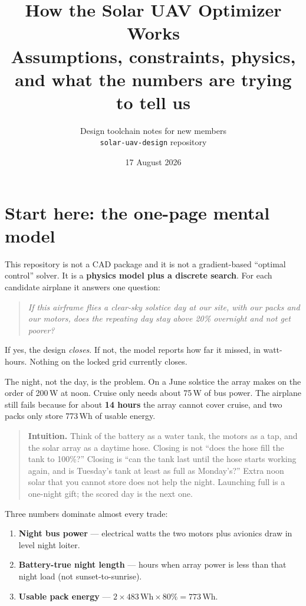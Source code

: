 \documentclass[11pt,letterpaper]{article}
\title{\textbf{How the Solar UAV Optimizer Works}\\[0.4em]
\large Assumptions, constraints, physics, and what the numbers are trying to tell us}
\author{Design toolchain notes for new members\\
\texttt{solar-uav-design} repository}
\date{17 August 2026}
\newenvironment{intuition}{\begin{quote}\small}{\end{quote}}
\begin{document}
\maketitle
\tableofcontents
\newpage

\section{Start here: the one-page mental model}

This repository is not a CAD package and it is not a gradient-based ``optimal control'' solver.
It is a \textbf{physics model plus a discrete search}. For each candidate airplane it answers one question:

\begin{quote}
\textit{If this airframe flies a clear-sky solstice day at our site, with our packs and our motors, does the repeating day stay above 20\% overnight and not get poorer?}
\end{quote}

If yes, the design \emph{closes}. If not, the model reports how far it missed, in watt-hours. Nothing on the locked grid currently closes.

The night, not the day, is the problem. On a June solstice the array makes on the order of 200\,W at noon. Cruise only needs about 75\,W of bus power. The airplane still fails because for about \textbf{14 hours} the array cannot cover cruise, and two packs only store 773\,Wh of usable energy.

\begin{intuition}
\textbf{Intuition.} Think of the battery as a water tank, the motors as a tap, and the solar array as a daytime hose. Closing is not ``does the hose fill the tank to 100\%?'' Closing is ``can the tank last until the hose starts working again, and is Tuesday's tank at least as full as Monday's?'' Extra noon solar that you cannot store does not help the night. Launching full is a one-night gift; the scored day is the next one.
\end{intuition}

Three numbers dominate almost every trade:

\begin{enumerate}
  \item \textbf{Night bus power} --- electrical watts the two motors plus avionics draw in level night loiter.
  \item \textbf{Battery-true night length} --- hours when array power is less than that night load (not sunset-to-sunrise).
  \item \textbf{Usable pack energy} --- $2 \times 483\,\mathrm{Wh} \times 80\% = 773\,\mathrm{Wh}$.
\end{enumerate}
\end{document}

